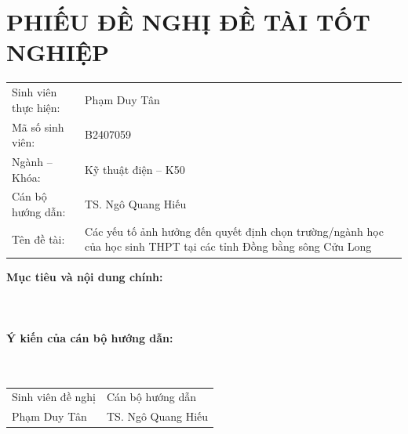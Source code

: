 \chapter*{PHIẾU ĐỀ NGHỊ ĐỀ TÀI TỐT NGHIỆP}\thispagestyle{empty}
\noindent\begin{tabularx}{\textwidth}{p{4.3cm}X}
Sinh viên thực hiện: & Phạm Duy Tân\\
Mã số sinh viên: & B2407059\\
Ngành -- Khóa: & Kỹ thuật điện -- K50\\
Cán bộ hướng dẫn: & TS. Ngô Quang Hiếu\\
Tên đề tài: & Các yếu tố ảnh hưởng đến quyết định chọn trường/ngành học của học sinh THPT tại các tỉnh Đồng bằng sông Cửu Long\\
\end{tabularx}
\vspace{0.6cm}
\noindent\textbf{Mục tiêu và nội dung chính:}\\[0.3cm]
\dotfill\\[0.55cm]\dotfill\\[0.55cm]\dotfill\\[0.55cm]\dotfill
\vspace{0.8cm}
\noindent\textbf{Ý kiến của cán bộ hướng dẫn:}\\[0.3cm]
\dotfill\\[0.55cm]\dotfill\\[0.55cm]\dotfill
\vfill
\noindent\begin{tabularx}{\textwidth}{>{\centering\arraybackslash}X>{\centering\arraybackslash}X}
Sinh viên đề nghị & Cán bộ hướng dẫn\\[2.2cm]
Phạm Duy Tân & TS. Ngô Quang Hiếu
\end{tabularx}
